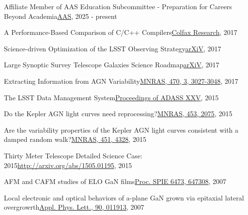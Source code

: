 \documentclass[10pt,a4paper]{article}
\begin{document}
\spacedhrule{2.0em}{0.2em}





\inlineheadsection
 {Affiliate Member of AAS Education Subcommittee  - Preparation for Careers Beyond Academia}{\href{https://aas.org/comms/education-committee}{AAS}, 2025 - present}

\inlineheadsection
  {A Performance-Based Comparison of C/C++ Compilers}{\href{https://colfaxresearch.com/compiler-comparison/}{Colfax Research}, 2017}

\inlineheadsection
  {Science-driven Optimization of the LSST Observing Strategy}{\href{https://arxiv.org/abs/1708.04058}{arXiV}, 2017}

\inlineheadsection
  {Large Synoptic Survey Telescope Galaxies Science Roadmap}{\href{https://arxiv.org/abs/1708.01617}{arXiV}, 2017}

\inlineheadsection
  {Extracting Information from AGN Variability}{\href{https://doi.org/10.1093/mnras/stx1420}{MNRAS, 470, 3, 3027-3048}, 2017}

\inlineheadsection
  {The LSST Data Management System}{\href{http://adsabs.harvard.edu/cgi-bin/bib_query?arXiv:1512.07914}{Proceedings of ADASS XXV}, 2015}

\inlineheadsection
  {Do the Kepler AGN light curves need reprocessing?}{\href{http://dx.doi.org/10.1093/mnras/stv1797}{MNRAS, 453, 2075}, 2015}

\inlineheadsection
  {Are the variability properties of the Kepler AGN light curves consistent with a damped random walk?}{\href{http://dx.doi.org/ 10.1093/mnras/stv1230}{MNRAS, 451, 4328}, 2015}

\inlineheadsection
 {Thirty Meter Telescope Detailed Science Case: 2015}{\href{http://arxiv.org/abs/1505.01195}{http://arxiv.org/abs/1505.01195}, 2015}

\inlineheadsection
  {AFM and CAFM studies of ELO GaN films}{\href{http://dx.doi.org/10.1117/12.706773}{Proc. SPIE 6473, 647308}, 2007}

\inlineheadsection
  {Local electronic and optical behaviors of a-plane GaN grown via epitaxial lateral overgrowrth}{\href{http://dx.doi.org/10.1063/1.2429901}{Appl. Phys. Lett., 90, 011913}, 2007}


\end{document}
